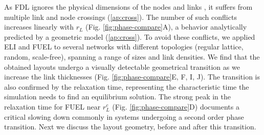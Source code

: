 \documentclass[linenumbers,endfloats,nofootinbib,preprint,floatfix,titlepage,superscriptaddress]{revtex4-1} %
\begin{document}
As FDL ignores the physical dimensions of the nodes and links%
, it suffers from multiple link and node crossings (\ref{ap:cross}). %
The number of such conflicts increases linearly with $r_L$ (Fig. \ref{fig:phase-compare}A), a behavior analytically predicted by a geometric model (\ref{ap:cross}). %
To avoid these conflicts, we applied ELI and FUEL to several networks with different topologies (regular lattice, random, scale-free), spanning a range of sizes and link densities. 
We find that the obtained layouts undergo a visually detectable geometrical transition as we increase the link thicknesses (Fig. \ref{fig:phase-compare}E, F, I, J). 
The transition is also confirmed by the relaxation time, representing the characteristic time the simulation needs to find an equilibrium solution. The strong peak in the relaxation time for FUEL near $r_L^c$ (Fig. \ref{fig:phase-compare}D)
documents a critical slowing down commonly in systems undergoing a second order phase transition. 
Next we discuss the layout geometry, before and after this transition.%
\end{document}
